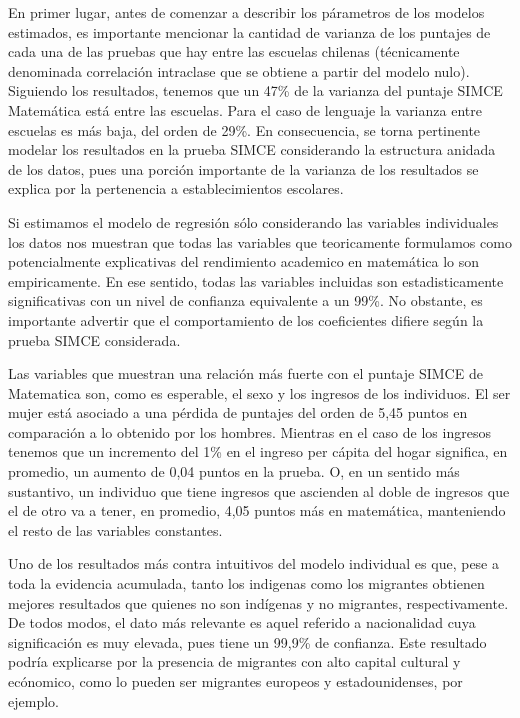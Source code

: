 \documentclass[
]{article}
\begin{document}
\pagebreak

En primer lugar, antes de comenzar a describir los párametros de los
modelos estimados, es importante mencionar la cantidad de varianza de
los puntajes de cada una de las pruebas que hay entre las escuelas
chilenas (técnicamente denominada correlación intraclase que se obtiene
a partir del modelo nulo). Siguiendo los resultados, tenemos que un 47\%
de la varianza del puntaje SIMCE Matemática está entre las escuelas.
Para el caso de lenguaje la varianza entre escuelas es más baja, del
orden de 29\%. En consecuencia, se torna pertinente modelar los
resultados en la prueba SIMCE considerando la estructura anidada de los
datos, pues una porción importante de la varianza de los resultados se
explica por la pertenencia a establecimientos escolares.

Si estimamos el modelo de regresión sólo considerando las variables
individuales los datos nos muestran que todas las variables que
teoricamente formulamos como potencialmente explicativas del rendimiento
academico en matemática lo son empiricamente. En ese sentido, todas las
variables incluidas son estadisticamente significativas con un nivel de
confianza equivalente a un 99\%. No obstante, es importante advertir que
el comportamiento de los coeficientes difiere según la prueba SIMCE
considerada.

Las variables que muestran una relación más fuerte con el puntaje SIMCE
de Matematica son, como es esperable, el sexo y los ingresos de los
individuos. El ser mujer está asociado a una pérdida de puntajes del
orden de 5,45 puntos en comparación a lo obtenido por los hombres.
Mientras en el caso de los ingresos tenemos que un incremento del 1\% en
el ingreso per cápita del hogar significa, en promedio, un aumento de
0,04 puntos en la prueba. O, en un sentido más sustantivo, un individuo
que tiene ingresos que ascienden al doble de ingresos que el de otro va
a tener, en promedio, 4,05 puntos más en matemática, manteniendo el
resto de las variables constantes.

Uno de los resultados más contra intuitivos del modelo individual es
que, pese a toda la evidencia acumulada, tanto los indigenas como los
migrantes obtienen mejores resultados que quienes no son indígenas y no
migrantes, respectivamente. De todos modos, el dato más relevante es
aquel referido a nacionalidad cuya significación es muy elevada, pues
tiene un 99,9\% de confianza. Este resultado podría explicarse por la
presencia de migrantes con alto capital cultural y ecónomico, como lo
pueden ser migrantes europeos y estadounidenses, por ejemplo.
\end{document}
